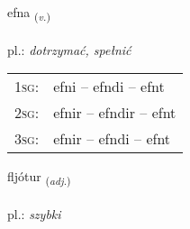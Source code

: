 \documentclass[frontgrid, backgrid]{flacards}\usepackage[]{graphicx}\usepackage[]{xcolor}
\begin{document}
{efna \small{\textsubscript{(\textit{v.})}} \\[1ex] %
\textphonetic{[ɛpna]} \\
pl.: \emph{dotrzymać, spełnić} \\  [2ex]
\renewcommand*{\arraystretch}{0.8}
\begin{tabular}{p{1cm}l}
\textsc{1sg}: & efni -- efndi -- efnt \\ 
\textsc{2sg}: & efnir -- efndir -- efnt \\ 
\textsc{3sg}: & efnir -- efndi -- efnt \\ 
\end{tabular}
}

\renewcommand{\flhead}{\vskip5pt \fboxsep=0pt {\small\bfseries\footnotesize Lýsingarorð | Adjective}}
\renewcommand{\fcfoot}{\vskip5pt \fboxsep=0pt \hspace{2pt}{\small\bfseries\footnotesize 2K}}

\renewcommand{\blhead}{\vskip5pt {\small\bfseries\footnotesize Lýsingarorð | Adjective }}
\renewcommand{\bcfoot}{\vskip5pt \hspace{2pt}{\small\bfseries\footnotesize 2K}}


{fljótur \small{\textsubscript{(\textit{adj.})}} \\[1ex] %
\textphonetic{[fljouːtʏr]} \\
pl.: \emph{szybki} \\  [2ex]
\renewcommand*{\arraystretch}{0.8}
}

\renewcommand{\flhead}{\vskip5pt \fboxsep=0pt {\small\bfseries\footnotesize Nafnorð | Noun}}
\renewcommand{\fcfoot}{\vskip5pt \fboxsep=0pt \hspace{2pt}{\small\bfseries\footnotesize 2K}}
\end{document}
